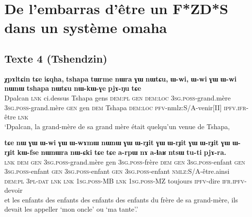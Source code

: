 \documentclass[oneside,a4paper,11pt]{article}
\newcommand{\ipa}[1]{{\phon\textbf{#1}}}
\begin{document}
\section{De l'embarras d'être un F*ZD*S dans un système omaha}


\subsection{Texte 4 (Tshendzin)}

\begin{exe}
\ex 
\gll 
\ipa{χpɤltɕin} 	\ipa{tɕe} 	\ipa{iɕqha,} 	\ipa{tshapa} 	\ipa{tɯrme} 	\ipa{nɯra} 	\ipa{ɣɯ} 	\ipa{nɯtɕu,} \ipa{ɯ-wi,} 	\ipa{ɯ-wi} 	\ipa{ɣɯ} 	\ipa{ɯ-wi} 	\ipa{nɯnɯ} 	\ipa{tshapa} 	\ipa{nɯtɕu} 	\ipa{nɯ-kɯ-ɣe} 	\ipa{pjɤ-ŋu} 	\ipa{tɕe}  \\
Dpalcan \textsc{lnk} ci.dessus Tshapa gens  \textsc{dem:pl} \textsc{gen}  \textsc{dem:loc} \textsc{3sg.poss}-grand.mère  \textsc{3sg.poss}-grand.mère  \textsc{gen} gen \textsc{dem} Tshapa \textsc{dem:loc} \textsc{pfv}-nmlz:S/A-venir[II] \textsc{ipfv.ifr}-être \textsc{lnk}  \\
\glt `Dpalcan, la grand-mère de sa grand mère était quelqu'un venue de Tshapa, 
\end{exe}
\begin{exe}
\ex 
\gll 
\ipa{tɕe} 	\ipa{nɯ} 	\ipa{ɣɯ} 	\ipa{ɯ-wi} 	\ipa{ɣɯ} 	\ipa{ɯ-wɤmɯ} 	\ipa{nɯnɯ} 	\ipa{ɣɯ} 	\ipa{ɯ-rɟit} 	\ipa{ɣɯ} 	\ipa{ɯ-rɟit} 	\ipa{ɣɯ} 	\ipa{ɯ-rɟit} 	\ipa{ɣɯ} 	\ipa{ɯ-rɟit} 	\ipa{kɯ-fse} 	\ipa{nɯnɯra} 	\ipa{nɯ-ɕki} 	\ipa{tɕe} 	\ipa{tɕe} 	\ipa{a-rpɯ} \ipa{nɤ} \ipa{a-ɬaʁ} 	\ipa{ntsɯ} 	\ipa{tu-ti} 	\ipa{pjɤ-ra.} \\
\textsc{lnk} \textsc{dem} \textsc{gen} \textsc{3sg.poss}-grand.mère gen \textsc{3sg.poss}-frère \textsc{dem} \textsc{gen} \textsc{3sg.poss}-enfant \textsc{gen} \textsc{3sg.poss}-enfant \textsc{gen} \textsc{3sg.poss}-enfant \textsc{gen} \textsc{3sg.poss}-enfant \textsc{nmlz}:S/A-être.ainsi \textsc{dem:pl} \textsc{3pl-dat} \textsc{lnk}  \textsc{lnk} \textsc{1sg.poss}-MB \textsc{lnk} \textsc{1sg.poss}-MZ toujours \textsc{ipfv}-dire \textsc{ifr.ipfv}-devoir \\
\glt et les enfants des enfants des enfants des enfants du frère de sa grand-mère, ils devait les appeller `mon oncle' ou `ma tante'.'
\end{exe}
\end{document}
